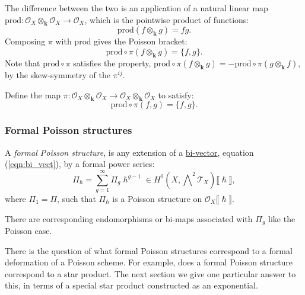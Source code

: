     The difference between the two is an application of a natural linear map \( \mathrm{prod} : \mathcal{O}_X \otimes_{\mathbf{k}} \mathcal{O}_X \rightarrow \mathcal{O}_X\), which is the pointwise product of functions: 
    \[ \mathrm{prod}(f \otimes_{\mathbf{k}} g ) = f g.\]
    Composing \(\pi\) with \( \mathrm{prod} \) gives the Poisson bracket:
    \[ \mathrm{prod} \circ \pi (f\otimes_{\mathbf{k}} g) = \{ f, g\}. \]
    Note that \( \mathrm{prod} \circ  \pi \) satisfies the property, \( \mathrm{prod} \circ  \pi ( f \otimes_{\mathbf{k}} g) = -\mathrm{prod} \circ  \pi ( g \otimes_{\mathbf{k}} f ) \), by the skew-symmetry of the \( \pi^{ij}\).

    
    
    \begin{defn}
    Define the map \( \pi : \mathcal{O}_X \otimes_{\mathbf{k}} \mathcal{O}_X \rightarrow \mathcal{O}_X \otimes_{\mathbf{k}} \mathcal{O}_X\) to satisfy:  
    \[  \mathrm{prod} \circ \pi (f,g) = \{ f, g\}. \]
    \end{defn}
    
    
    \subsubsection{Formal Poisson structures}
    \begin{defn} 
    A \emph{formal Poisson structure}, is any extension of a \hyperref[defn:bi_vect]{bi-vector}, equation (\ref{eqn:bi_vect}), by a formal power series:
    \[ \Pi_{\hslash} =  \sum_{g=1}^{\infty} \Pi_g \hslash^{g-1} \in H^0(X,\bigwedge\nolimits^{\!2} \mathcal{T}_X)\lBrack \hslash \rBrack , \]
    where \(\Pi_1 = \Pi\), such that 
    \( \Pi_{\hslash} \) is a Poisson structure on \( \mathcal{O}_X \lBrack \hslash \rBrack \).
    \end{defn}

    There are corresponding endomorphisms or bi-maps associated with \( \Pi_g\) like the Poisson case. 
    
    There is the question of what formal Poisson structures correspond to a formal deformation of a Poisson scheme. For example, does a formal Poisson structure correspond to a star product. The next section we give one particular answer to this, in terms of a special star product constructed as an exponential.
    
